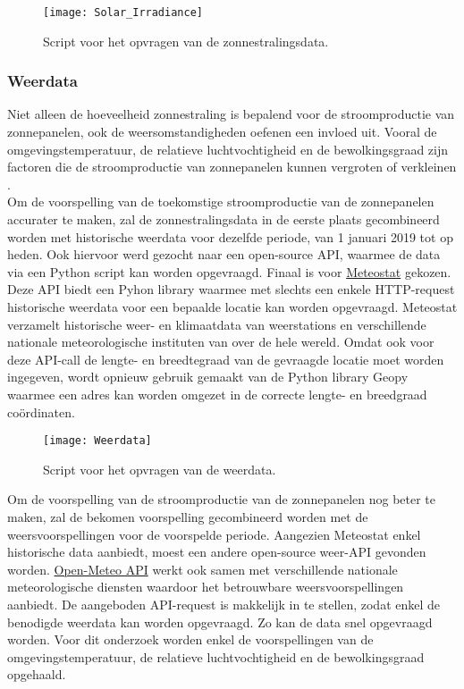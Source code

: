 \begin{figure}[h!]
    \centering\texttt{[image: Solar\_Irradiance]}
    \caption{\label{fig:Solar_Irradiance}Script voor het opvragen van de zonnestralingsdata.}
\end{figure} 

\newpage
\subsubsection{Weerdata}

Niet alleen de hoeveelheid zonnestraling is bepalend voor de stroomproductie van zonnepanelen, ook de weersomstandigheden oefenen een invloed uit. Vooral de omgevingstemperatuur, de relatieve luchtvochtigheid en de bewolkingsgraad zijn factoren die de stroomproductie van zonnepanelen kunnen vergroten of verkleinen \autocite{Sehrawat2023}. \\

Om de voorspelling van de toekomstige stroomproductie van de zonnepanelen accurater te maken, zal de zonnestralingsdata in de eerste plaats gecombineerd worden met historische weerdata voor dezelfde periode, van 1 januari 2019 tot op heden. Ook hiervoor werd gezocht naar een open-source API, waarmee de data via een Python script kan worden opgevraagd. Finaal is voor \href{https://dev.meteostat.net/}{Meteostat} gekozen. Deze API biedt een Pyhon library waarmee met slechts een enkele HTTP-request historische weerdata voor een bepaalde locatie kan worden opgevraagd. Meteostat verzamelt historische weer- en klimaatdata van weerstations en verschillende nationale meteorologische instituten van over de hele wereld. Omdat ook voor deze API-call de lengte- en breedtegraad van de gevraagde locatie moet worden ingegeven, wordt opnieuw gebruik gemaakt van de Python library Geopy waarmee een adres kan worden omgezet in de correcte lengte- en breedgraad coördinaten. \\

\begin{figure}[h!]
    \centering\texttt{[image: Weerdata]}
    \caption{\label{fig:Weerdata}Script voor het opvragen van de weerdata.}
\end{figure} 

Om de voorspelling van de stroomproductie van de zonnepanelen nog beter te maken, zal de bekomen voorspelling gecombineerd worden met de weersvoorspellingen voor de voorspelde periode. Aangezien Meteostat enkel historische data aanbiedt, moest een andere open-source weer-API gevonden worden. \href{https://open-meteo.com/}{Open-Meteo API} werkt ook samen met verschillende nationale meteorologische diensten waardoor het betrouwbare weersvoorspellingen aanbiedt. De aangeboden API-request is makkelijk in te stellen, zodat enkel de benodigde weerdata kan worden opgevraagd. Zo kan de data snel opgevraagd worden. Voor dit onderzoek worden enkel de voorspellingen van de omgevingstemperatuur, de relatieve luchtvochtigheid en de bewolkingsgraad opgehaald.


